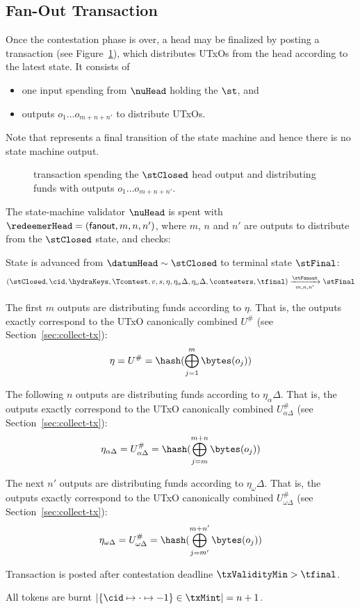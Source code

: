 \subsection{Fan-Out Transaction}\label{sec:fanout-tx}

Once the contestation phase is over, a head may be finalized by posting a
\mtxFanout{} transaction (see Figure~\ref{fig:fanoutTx}), which
distributes UTxOs from the head according to the latest state. It consists of
\begin{itemize}
  \item one input spending from $\nuHead$ holding the $\st$, and
  \item outputs $o_{1} \dots o_{m+n+n'}$ to distribute UTxOs.
\end{itemize}

Note that \mtxFanout{} represents a final transition of the state machine and
hence there is no state machine output.

\begin{figure}
  \centering
  
  \caption{\mtxFanout{} transaction spending the $\stClosed$ head output and
	distributing funds with outputs $o_{1} \dots o_{m+n+n'}$.}\label{fig:fanoutTx}
\end{figure}

\noindent The state-machine validator $\nuHead$ is spent with
$\redeemerHead = (\mathsf{fanout}, m, n, n')$, where $m$, $n$ and $n'$ are
outputs to distribute from the $\stClosed$ state, and checks:
\begin{menumerate}
  \item State is advanced from $\datumHead \sim \stClosed$ to terminal state
  $\stFinal$: %
  \[
	(\stClosed,\cid,\hydraKeys,\Tcontest,v, s,\eta,\eta_\alpha\Delta,\eta_\omega\Delta,\contesters,\tfinal) \xrightarrow[m,n,n']{\stFanout} \stFinal
  \]
  \item The first $m$ outputs are distributing funds according to $\eta$. That is,
  the outputs exactly correspond to the UTxO canonically combined $U^{\#}$ (see
  Section~\ref{sec:collect-tx}):
  \[
	\eta = U^{\#} = \hash(\bigoplus_{j=1}^{m} \bytes(o_{j}))
  \]
  \item The following $n$ outputs are distributing funds according to
  $\eta_\alpha\Delta$. That is, the outputs exactly correspond to the UTxO canonically
  combined $U^{\#}_{\alpha\Delta}$ (see Section~\ref{sec:collect-tx}):
  \[
	\eta_{\alpha\Delta} = U^{\#}_{\alpha\Delta} = \hash(\bigoplus_{j=m}^{m+n} \bytes(o_{j}))
  \]
  \item The next $n'$ outputs are distributing funds according to
  $\eta_\omega\Delta$. That is, the outputs exactly correspond to the UTxO canonically
  combined $U^{\#}_{\omega\Delta}$ (see Section~\ref{sec:collect-tx}):
  \[
	\eta_{\omega\Delta} = U^{\#}_{\omega\Delta} = \hash(\bigoplus_{j=m'}^{m+n'} \bytes(o_{j}))
  \]
  \item Transaction is posted after contestation deadline $\txValidityMin > \tfinal$.
  \item All tokens are burnt
  $|\{\cid \mapsto \cdot \mapsto -1\} \in \txMint| = n + 1$.
\end{menumerate}

